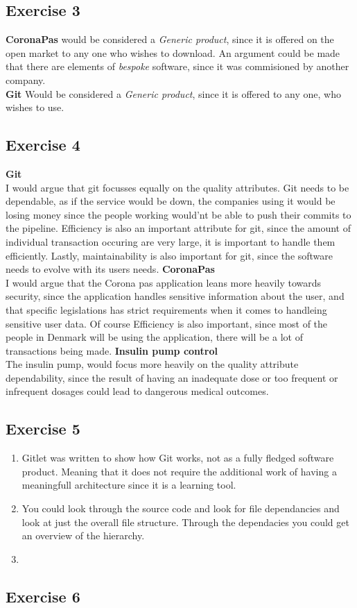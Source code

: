 \documentclass{article}
\begin{document}
\subsection*{Exercise 3} 
\textbf{CoronaPas} would be considered a \textit{Generic product}, since it is offered on the open market to any one who wishes to download. An argument could be made that there are elements of \textit{bespoke} software, since it was commisioned by another company.
\\
\textbf{Git} Would be considered a \textit{Generic product}, since it is offered to any one, who wishes to use.
\subsection*{Exercise 4}
\textbf{Git} \\
I would argue that git focusses equally on the quality attributes. Git needs to be dependable, as if the service would be down, the companies using it would be losing money since the people working would'nt be able to push their commits to the pipeline. 
Efficiency is also an important attribute for git, since the amount of individual transaction occuring are very large, it is important to handle them efficiently.
Lastly, maintainability is also important for git, since the software needs to evolve with its users needs.
\textbf{CoronaPas} \\
I would argue that the Corona pas application leans more heavily towards security, since the application handles sensitive information about the user, and that specific legislations has strict requirements when it comes to handleing sensitive user data.
Of course Efficiency is also important, since most of the people in Denmark will be using the application, there will be a lot of transactions being made.
\textbf{Insulin pump control} \\
The insulin pump, would focus more heavily on the quality attribute dependability, since the result of having an inadequate dose or too frequent or infrequent dosages could lead to dangerous medical outcomes.
\subsection*{Exercise 5}
\begin{enumerate}
    \item Gitlet was written to show how Git works, not as a fully fledged software product. Meaning that it does not require the additional work of having a meaningfull architecture since it is a learning tool.
    \item You could look through the source code and look for file dependancies and look at just the overall file structure. Through the dependacies you could get an overview of the hierarchy.
    \item 
\end{enumerate}
\subsection*{Exercise 6}
\end{document}
